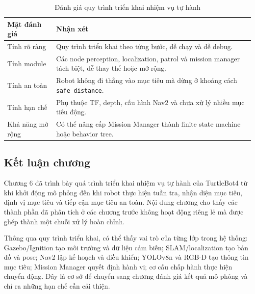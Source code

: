 \begin{table}[H]
    \centering
    \caption{Đánh giá quy trình triển khai nhiệm vụ tự hành}
    \label{tab:deployment-assessment}
    \renewcommand{\arraystretch}{1.25}
    \small
    \begin{tabularx}{\textwidth}{|>{\raggedright\arraybackslash}p{}|>{\raggedright\arraybackslash}X|}
        \hline
        \textbf{Mặt đánh giá} & \textbf{Nhận xét} \\
        \hline
        Tính rõ ràng & Quy trình triển khai theo từng bước, dễ chạy và dễ debug. \\
        \hline
        Tính module & Các node perception, localization, patrol và mission manager tách biệt, dễ thay thế hoặc mở rộng. \\
        \hline
        Tính an toàn & Robot không đi thẳng vào mục tiêu mà dừng ở khoảng cách \texttt{safe\_distance}. \\
        \hline
        Tính hạn chế & Phụ thuộc TF, depth, cấu hình Nav2 và chưa xử lý nhiều mục tiêu động. \\
        \hline
        Khả năng mở rộng & Có thể nâng cấp Mission Manager thành finite state machine hoặc behavior tree. \\
        \hline
    \end{tabularx}
\end{table}

\subsection{Kết luận chương}
\label{subsec:deployment-conclusion}

Chương 6 đã trình bày quá trình triển khai nhiệm vụ tự hành của TurtleBot4 từ khi khởi động mô phỏng đến khi robot thực hiện tuần tra, nhận diện mục tiêu, định vị mục tiêu và tiếp cận mục tiêu an toàn. Nội dung chương cho thấy các thành phần đã phân tích ở các chương trước không hoạt động riêng lẻ mà được ghép thành một chuỗi xử lý hoàn chỉnh.

Thông qua quy trình triển khai, có thể thấy vai trò của từng lớp trong hệ thống: Gazebo/Ignition tạo môi trường và dữ liệu cảm biến; SLAM/localization tạo bản đồ và pose; Nav2 lập kế hoạch và điều khiển; YOLOv8n và RGB-D tạo thông tin mục tiêu; Mission Manager quyết định hành vi; cơ cấu chấp hành thực hiện chuyển động. Đây là cơ sở để chuyển sang chương đánh giá kết quả mô phỏng và chỉ ra những hạn chế cần cải thiện.